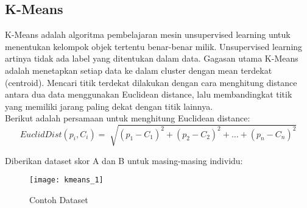 \subsection{K-Means} 
K-Means adalah algoritma pembelajaran mesin unsupervised learning untuk menentukan kelompok objek tertentu benar-benar milik. Unsupervised learning artinya tidak ada label yang ditentukan dalam data. Gagasan utama K-Means adalah menetapkan setiap data ke dalam cluster dengan mean terdekat (centroid). Mencari titik terdekat dilakukan dengan cara menghitung distance antara dua data menggunakan Euclidean distance, lalu membandingkat titik yang memiliki jarang paling dekat dengan titik lainnya. \\

\noindent Berikut adalah persamaan untuk menghitung Euclidean distance:
\begin{equation}
EuclidDist(p_i,C_i) = \sqrt[]{(p_1-C_1)^2+(p_2-C_2)^2+\ldots +(p_n-C_n)^2}
\end{equation}
\vspace{0.2cm}

\noindent Diberikan dataset skor A dan B untuk masing-masing individu:

\begin{figure}[H]
	\centering
	\texttt{[image: kmeans\_1]}
	\caption{Contoh Dataset}
	\label{fig:kmeans_1}
\end{figure}

